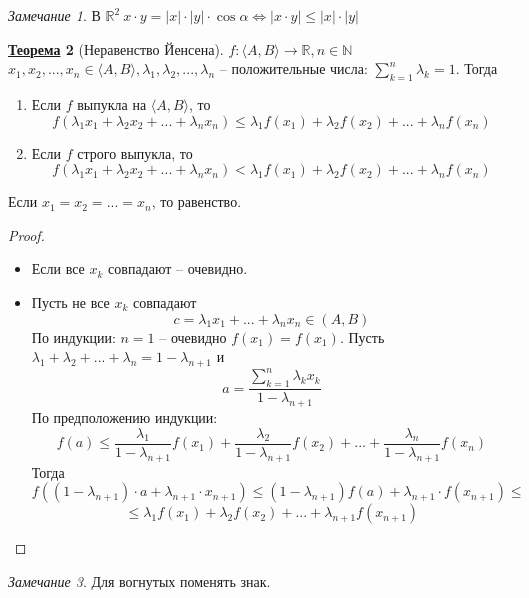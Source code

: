 \documentclass[12pt]{article}
\newenvironment{MyList}[1][4pt]{
  \begin{enumerate}[1.]
  \setlength{\parskip}{0pt}
  \setlength{\itemsep}{#1}
}{       
  \end{enumerate}
}
\newenvironment{MyItemize}[1][4pt]{
  \begin{itemize}
  \setlength{\parskip}{0pt}
  \setlength{\itemsep}{#1}
}{       
  \end{itemize}
}
\def\N{\mathbb{N}}       %
\def\R{\mathbb{R}}       %
\def\EQ{\Leftrightarrow} %
\theoremstyle{definition} %
\newtheorem{Thm}{\underline{Теорема}}[subsection] %
\theoremstyle{plain} %
\theoremstyle{remark} %
\newtheorem{Rem}[Thm]{Замечание} %
\begin{document}
\begin{Rem}
    В $\R^2 \ x \cdot y = |x| \cdot |y| \cdot \cos \alpha \EQ |x \cdot y| \leqslant |x| \cdot |y|$ 
\end{Rem}

\begin{Thm}[Неравенство Йенсена]
    $f : \langle A, B\rangle \to \R, n \in \N$ \\ $x_1, x_2, ..., x_n \in \langle A, B\rangle, \lambda_1, \lambda_2, ..., \lambda_n$ -- положительные числа: 
    $\sum_{k = 1}^n \lambda_k = 1$. Тогда
    \begin{MyList}
        \item Если $f$ выпукла на $\langle A, B\rangle$, то
        \[f(\lambda_1 x_1 + \lambda_2 x_2 + ... + \lambda_n x_n) \leqslant \lambda_1f(x_1) + \lambda_2 f(x_2) + ... + \lambda_n f(x_n)\]

        \item Если $f$ строго выпукла, то 
        \[f(\lambda_1 x_1 + \lambda_2 x_2 + ... + \lambda_n x_n) < \lambda_1f(x_1) + \lambda_2 f(x_2) + ... + \lambda_n f(x_n)\]
    \end{MyList} 
    Если $x_1 = x_2 = ... = x_n$, то равенство.
\end{Thm}

\begin{proof}
    \begin{MyItemize}
        \item Если все $x_k$ совпадают -- очевидно.
        \item Пусть не все $x_k$ совпадают
        \[c = \lambda_1 x_1 + ... + \lambda_n x_n \in (A, B)\]
        По индукции: $n = 1$ -- очевидно $f(x_1) = f(x_1)$.
        Пусть $\lambda_1 + \lambda_2 + ... + \lambda_n = 1 - \lambda_{n + 1}$ и 
        \[a = \frac{\sum_{k = 1}^n \lambda_k x_k}{1 - \lambda_{n + 1}}\]
        По предположению индукции:
        \[f(a) \leqslant \frac{\lambda_1}{1 - \lambda_{n + 1}} f(x_1) + \frac{\lambda_2}{1 - \lambda_{n + 1}}f(x_2) + ... + \frac{\lambda_n}{1 - \lambda_{n + 1}} f(x_n)\]
        Тогда
        \[f((1 - \lambda_{n + 1}) \cdot a + \lambda_{n + 1} \cdot x_{n + 1}) \leqslant (1 - \lambda_{n + 1}) f(a) + \lambda_{n + 1} \cdot f(x_{n + 1}) \leqslant\]
        \[\leqslant \lambda_1 f(x_1) + \lambda_2 f(x_2) + ... + \lambda_{n + 1} f(x_{n + 1})\] 
    \end{MyItemize}
\end{proof}

\begin{Rem}
    Для вогнутых поменять знак.
\end{Rem}
\end{document}
